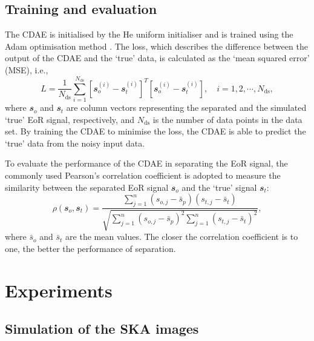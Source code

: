\documentclass[letters,a4paper,fleqn,usenatbib]{mnras}
\newcommand{\R}[1]{\mathrm{#1}}
\newcommand{\B}[1]{\mathbfit{#1}}
\begin{document}
\subsection{Training and evaluation}
\label{sec:train-eval}

The CDAE is initialised by the He uniform initialiser \citep{he2015}
and is trained using the Adam optimisation method \citep{kingma2015}.
The loss, which describes the difference between the output of the CDAE
and the `true' data, is calculated as the `mean squared error' (MSE),
i.e.,
\begin{equation}
  \label{eq:loss}
  L = \frac{1}{N_{\R{ds}}} \sum_{i=1}^{N_{\R{ds}}}
    \left[ \B{s}_o^{(i)} - \B{s}_t^{(i)} \right]^T
    \left[ \B{s}_o^{(i)} - \B{s}_t^{(i)} \right],
    \quad i = 1, 2, \cdots, N_{\R{ds}},
\end{equation}
where
$\B{s}_o$ and $\B{s}_t$ are column vectors representing the separated
and the simulated `true' EoR signal, respectively,
and $N_{\R{ds}}$ is the number of data points in the data set.
By training the CDAE to minimise the loss, the CDAE is able to predict
the `true' data from the noisy input data.

To evaluate the performance of the CDAE in separating the EoR signal,
the commonly used Pearson's correlation coefficient
\citep[e.g.,][]{harker2009,chapman2013}
is adopted to measure the similarity between the separated EoR signal
$\B{s}_o$ and the `true' signal $\B{s}_t$:
\begin{equation}
  \label{eq:corrcoef}
  \rho(\B{s}_o, \B{s}_t) =
    \frac{\sum_{j=1}^{n}(s_{o,j}-\bar{s}_p)(s_{t,j}-\bar{s}_t)}{
      \sqrt{\sum_{j=1}^{n}(s_{o,j}-\bar{s}_p)^2
        \sum_{j=1}^{n}(s_{t,j}-\bar{s}_t)^2}
    },
\end{equation}
where $\bar{s}_o$ and $\bar{s}_t$ are the mean values.
The closer the correlation coefficient is to one, the better the
performance of separation.


\section{Experiments}
\label{sec:experiments}

\subsection{Simulation of the SKA images}
\label{sec:simulation}
\end{document}
